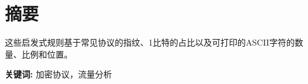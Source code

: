\section*{摘\hspace*{2em}要} %
这些启发式规则基于常见协议的指纹、1比特的占比以及可打印的ASCII字符的数量、比例和位置。

\vspace{28pt} 


\noindent\textbf{关键词:} 加密协议，流量分析  %

\newpage
